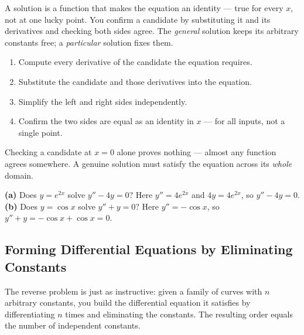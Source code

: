 \documentclass[11pt]{article}
\begin{document}
A solution is a function that makes the equation an identity --- true for every
$x$, not at one lucky point. You confirm a candidate by substituting it and its
derivatives and checking both sides agree. The \emph{general} solution keeps its
arbitrary constants free; a \emph{particular} solution fixes them.

\begin{methodbox}
\begin{enumerate}[leftmargin=1.6em, itemsep=2pt]
    \item Compute every derivative of the candidate the equation requires.
    \item Substitute the candidate and those derivatives into the equation.
    \item Simplify the left and right sides independently.
    \item Confirm the two sides are equal as an identity in $x$ --- for all
          inputs, not a single point.
\end{enumerate}
\end{methodbox}

\begin{warningbox}
Checking a candidate at $x = 0$ alone proves nothing --- almost any function
agrees somewhere. A genuine solution must satisfy the equation across its
\emph{whole} domain.
\end{warningbox}

\begin{examplebox}
\textbf{(a)} Does $y = e^{2x}$ solve $y'' - 4y = 0$? Here $y'' = 4e^{2x}$ and
$4y = 4e^{2x}$, so $y'' - 4y = 0$. \checkmark\\
\textbf{(b)} Does $y = \cos x$ solve $y'' + y = 0$? Here $y'' = -\cos x$, so
$y'' + y = -\cos x + \cos x = 0$. \checkmark
\end{examplebox}

\subsection{Forming Differential Equations by Eliminating Constants}

The reverse problem is just as instructive: given a family of curves with $n$
arbitrary constants, you build the differential equation it satisfies by
differentiating $n$ times and eliminating the constants. The resulting order
equals the number of independent constants.
\end{document}
